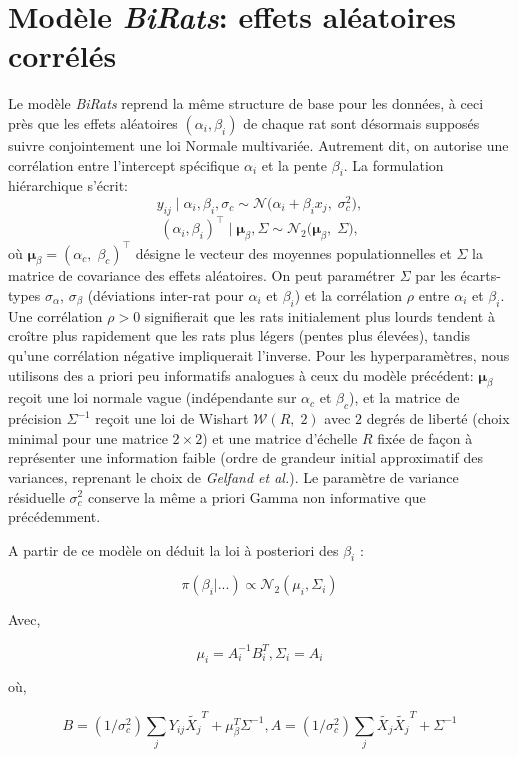 \documentclass[12pt]{article}
\begin{document}
\section{Modèle \textit{BiRats}: effets aléatoires corrélés}
Le modèle \textit{BiRats} reprend la même structure de base pour les données, à ceci près que les effets aléatoires $(\alpha_i,\beta_i)$ de chaque rat sont désormais supposés suivre conjointement une loi Normale multivariée. Autrement dit, on autorise une corrélation entre l'intercept spécifique $\alpha_i$ et la pente $\beta_i$. La formulation hiérarchique s'écrit:
\[
y_{ij} \mid \alpha_i,\beta_i,\sigma_c \sim \mathcal{N}\!\big(\alpha_i + \beta_i x_j,\;\sigma_c^2\big),
\] 
\[
(\alpha_i,\beta_i)^\top \mid \boldsymbol{\mu}_\beta,\Sigma \sim \mathcal{N}_2\!\big(\boldsymbol{\mu}_\beta,\;\Sigma\big),
\] 
où $\boldsymbol{\mu}_\beta=(\alpha_c,\;\beta_c)^\top$ désigne le vecteur des moyennes populationnelles et $\Sigma$ la matrice de covariance des effets aléatoires. On peut paramétrer $\Sigma$ par les écarts-types $\sigma_{\alpha}$, $\sigma_{\beta}$ (déviations inter-rat pour $\alpha_i$ et $\beta_i$) et la corrélation $\rho$ entre $\alpha_i$ et $\beta_i$. Une corrélation $\rho>0$ signifierait que les rats initialement plus lourds tendent à croître plus rapidement que les rats plus légers (pentes plus élevées), tandis qu'une corrélation négative impliquerait l'inverse. Pour les hyperparamètres, nous utilisons des a priori peu informatifs analogues à ceux du modèle précédent: $\boldsymbol{\mu}_\beta$ reçoit une loi normale vague (indépendante sur $\alpha_c$ et $\beta_c$), et la matrice de précision $\Sigma^{-1}$ reçoit une loi de Wishart $\mathcal{W}(R,\;2)$ avec $2$ degrés de liberté (choix minimal pour une matrice $2\times2$) et une matrice d'échelle $R$ fixée de façon à représenter une information faible (ordre de grandeur initial approximatif des variances, reprenant le choix de \textit{Gelfand et al.}). Le paramètre de variance résiduelle $\sigma_c^2$ conserve la même a priori Gamma non informative que précédemment.

A partir de ce modèle on déduit la loi à posteriori des $\beta_i$ :

$$\pi(\beta_i | ...) \propto \mathcal{N}_2(\mu_i, \Sigma_i)$$

Avec,

$$ \mu_i = A_i^{-1}B_{i}^T, \Sigma_i = A_i $$

où,

$$ B = (1/\sigma_c^2)\sum_{j}Y_{ij}\tilde{X_j}^T + \mu_{\beta}^T \Sigma^{-1}, A = (1/\sigma_c^2)\sum_{j}\tilde{X_j}\tilde{X_j}^T + \Sigma^{-1}$$
\end{document}
